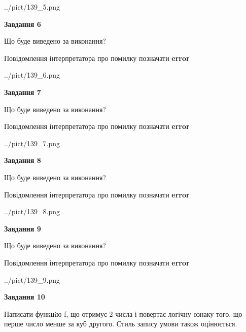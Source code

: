 \documentclass[12pt, ukrainian]{article}
\begin{document}
{\begin {large}
\begin{center}
	{../pict/139_5.png}
\end{center}
\newpage

{\begin {center}\textbf{Завдання 6}\end {center}}\par
Що буде виведено за виконання? \par
Повідомлення інтерпретатора про помилку позначати \textbf{error}

\begin{center}
	{../pict/139_6.png}
\end{center}
\newpage

{\begin {center}\textbf{Завдання 7}\end {center}}\par
Що буде виведено за виконання? \par
Повідомлення інтерпретатора про помилку позначати \textbf{error}

\begin{center}
	{../pict/139_7.png}
\end{center}
\newpage

{\begin {center}\textbf{Завдання 8}\end {center}}\par
Що буде виведено за виконання? \par
Повідомлення інтерпретатора про помилку позначати \textbf{error}

\begin{center}
	{../pict/139_8.png}
\end{center}
\newpage

{\begin {center}\textbf{Завдання 9}\end {center}}\par
Що буде виведено за виконання? \par
Повідомлення інтерпретатора про помилку позначати \textbf{error}

\begin{center}
	{../pict/139_9.png}
\end{center}
\newpage

{\begin {center}\textbf{Завдання 10}\end {center}}\par

Написати функцiю f, що отримує 2 числа і повертає логічну ознаку того, що перше число менше за куб другого. Стиль запису умови також оцінюється.\par
\newpage

\end {large}}
\end{document}
